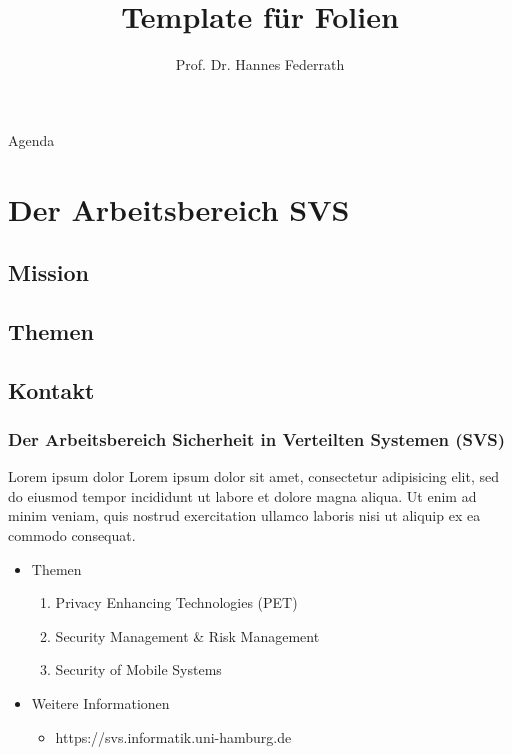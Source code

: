 \documentclass[t]{beamer}
\title{Template für Folien}
\author[Federrath]{Prof. Dr. Hannes Federrath}
\date{}
\begin{document}
\begin{frame}[plain]
	\maketitle
\end{frame}


\begin{frame}{Agenda}
	\tableofcontents
\end{frame}

\section{Der Arbeitsbereich SVS} %
\subsection{Mission} %
\subsection{Themen} %
\subsection{Kontakt} %

\begin{frame}
	\frametitle{Der Arbeitsbereich Sicherheit in Verteilten Systemen (SVS)}
	\begin{block}{Lorem ipsum dolor}
		Lorem ipsum dolor sit amet, consectetur adipisicing elit, sed do eiusmod tempor incididunt ut labore et dolore magna aliqua. Ut enim ad minim veniam, quis nostrud exercitation ullamco laboris nisi ut aliquip ex ea commodo consequat. 
	\end{block}
	\begin{itemize}
		\item Themen
			\begin{enumerate}
				\item Privacy Enhancing Technologies (PET)
				\item Security Management \& Risk Management
				\item Security of Mobile Systems
			\end{enumerate}
		\item Weitere Informationen
			\begin{itemize}
				\item https://svs.informatik.uni-hamburg.de
			\end{itemize}
	\end{itemize}
\end{frame}
\end{document}
